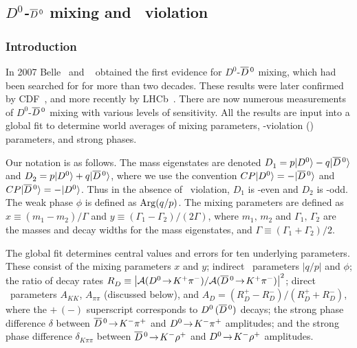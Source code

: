 \subsection{\emph{$D^0$-$\overline{D}{}^{\,0}$} mixing and \emph{\cp}\ violation}
\label{sec:charm:mixcpv}

\subsubsection{Introduction}

In 2007 Belle~\cite{Staric:2007dt} and \babar~\cite{Aubert:2007wf} 
obtained the first evidence for $D^0$-$\overline{D}{}^{\,0}$ mixing, which 
had been searched for for more than two decades. 
These results were later confirmed by CDF~\cite{Aaltonen:2007uc},
and more recently by LHCb~\cite{Aaij:2013wda}.
There are now numerous measurements of $D^0$-$\overline{D}{}^{\,0}$ mixing 
with various levels of sensitivity. All the results are
input into a global fit to determine
world averages of mixing parameters, \cp-violation (\cpv) 
parameters, and strong phases.

Our notation is as follows.
The mass eigenstates are denoted 
$D^{}_1 = p|D^0\rangle-q|\overline{D}{}^{\,0}\rangle$ and
$D^{}_2 = p|D^0\rangle+q|\overline{D}{}^{\,0}\rangle$, 
where we use the convention 
$CP|D^0\rangle=-|\overline{D}{}^{\,0}\rangle$ and 
$CP|\overline{D}{}^{\,0}\rangle=-|D^0\rangle$. Thus in the absence of 
\cp\ violation, $D^{}_1$ is \cp-even and $D^{}_2$ is \cp-odd.
The weak phase $\phi$ is defined as ${\rm Arg}(q/p)$.
The mixing parameters are defined as 
$x\equiv(m^{}_1-m^{}_2)/\Gamma$ and 
$y\equiv (\Gamma^{}_1-\Gamma^{}_2)/(2\Gamma)$, where 
$m^{}_1,\,m^{}_2$ and $\Gamma^{}_1,\,\Gamma^{}_2$ are
the masses and decay widths for the mass eigenstates,
and $\Gamma\equiv (\Gamma^{}_1+\Gamma^{}_2)/2$. 


The global fit determines central values and errors
for ten underlying parameters. These consist of the
mixing parameters $x$ and $y$; 
indirect \cpv\ parameters $|q/p|$ and $\phi$; 
the ratio of decay rates
$R^{}_D\equiv\left|{\cal A}(D^0\!\rightarrow\! K^+\pi^-)/
              {\cal A}(\overline{D}{}^{\,0}\!\rightarrow\! K^+\pi^-)\right|^2$;
direct \cpv\ parameters 
$A^{}_{KK}$, $A^{}_{\pi\pi}$ (discussed below), and
$A^{}_D =(R^+_D-R^-_D)/(R^+_D+R^-_D)$, where the $+\,(-)$
superscript corresponds to $D^0\,(\overline{D}{}^{\,0})$ decays;
the strong phase difference
$\delta$ between $\overline{D}{}^{\,0}\!\rightarrow\! K^-\pi^+$ and 
$D^0\!\rightarrow\! K^-\pi^+$ amplitudes; and 
the strong phase difference $\delta^{}_{K\pi\pi}$ between 
$\overline{D}{}^{\,0}\!\rightarrow\! K^-\rho^+$ and $D^0\!\rightarrow\! K^-\rho^+$ amplitudes. 

